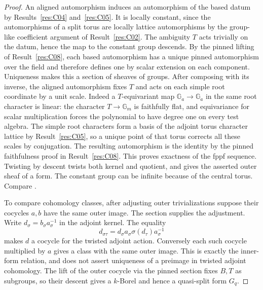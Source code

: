 \documentclass[11pt,a4paper,openany,oneside]{book}
\theoremstyle{resultstyle}
\theoremstyle{definition}
\numberwithin{equation}{chapter}
\newcommand{\Gm}{\mathbb{G}_m}
\newcommand{\Ga}{\mathbb{G}_a}
\begin{document}
\begin{proof}
An aligned automorphism induces an automorphism of the
based datum by Results~\ref{res:C04} and~\ref{res:C05}.
It is locally constant, since the automorphisms of a
split torus are locally lattice automorphisms by the
group-like coefficient argument of Result~\ref{res:C02}.
The ambiguity \(T\) acts trivially on the datum, hence
the map to the constant group descends.
By the pinned lifting of Result~\ref{res:C08}, each
based automorphism has a unique pinned automorphism
over the field and therefore defines one by scalar extension
on each component. Uniqueness makes this a section
of sheaves of groups. After composing with its inverse,
the aligned automorphism fixes \(T\) and acts on each
simple root coordinate by a unit scale. Indeed a
\(T\)-equivariant map \(\Ga\to\Ga\) in the same root
character is linear: the character \(T\to\Gm\)
is faithfully flat, and equivariance for scalar
multiplication forces the polynomial to have degree one
on every test algebra. The simple root characters form
a basis of the adjoint torus character lattice by
Result~\ref{res:C05}, so a unique point of that torus
corrects all these scales by conjugation. The resulting
automorphism is the identity by the pinned faithfulness
proof in Result~\ref{res:C08}. This proves exactness
of the fppf sequence. Twisting by descent twists
both kernel and quotient, and gives the asserted
outer sheaf of a form. The constant group can be
infinite because of the central torus.
Compare \cite[Theorem 7.1.9]{conrad}.

To compare cohomology classes, after adjusting outer
trivializations suppose their cocycles \(a,b\) have the
same outer image. The section supplies the adjustment.
Write \(d_\sigma=b_\sigma a_\sigma^{-1}\) in the adjoint
kernel. The equality
\[
 d_{\sigma\tau}=d_\sigma a_\sigma \sigma(d_\tau)a_\sigma^{-1}
\]
makes \(d\) a cocycle for the twisted adjoint action.
Conversely each such cocycle multiplied by \(a\)
gives a class with the same outer image.
This is exactly the inner-form relation, and does not
assert uniqueness of a preimage in twisted adjoint
cohomology. The lift of the outer cocycle via the
pinned section fixes \(B,T\) as subgroups, so their
descent gives a \(k\)-Borel and hence a quasi-split
form \(G_q\).


\end{proof}
\end{document}
